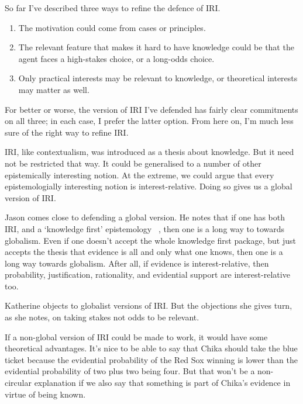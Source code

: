 So far I've described three ways to refine the defence of IRI.

\begin{enumerate}
\item The motivation could come from cases or principles.

\item The relevant feature that makes it hard to have knowledge could be that the agent faces a high-stakes choice, or a long-odds choice.

\item Only practical interests may be relevant to knowledge, or theoretical interests may matter as well.

\end{enumerate}
For better or worse, the version of IRI I've defended has fairly clear commitments on all three; in each case, I prefer the latter option. From here on, I'm much less sure of the right way to refine IRI.

IRI, like contextualism, was introduced as a thesis about knowledge. But it need not be restricted that way. It could be generalised to a number of other epistemically interesting notion. At the extreme, we could argue that every epistemologially interesting notion is interest-relative. Doing so gives us a global version of IRI.

Jason  \citet{Stanley2005} comes close to defending a global version. He notes that if one has both IRI, and a `knowledge first' epistemology ~\citep{Williamson2000}, then one is a long way to towards globalism. Even if one doesn't accept the whole knowledge first package, but just accepts the thesis that evidence is all and only what one knows, then one is a long way towards globalism. After all, if evidence is interest-relative, then probability, justification, rationality, and evidential support are interest-relative too.

Katherine  \citet{Rubin2015} objects to globalist versions of IRI. But the objections she gives turn, as she notes, on taking stakes not odds to be relevant. 

If a non-global version of IRI could be made to work, it would have some theoretical advantages. It's nice to be able to say that Chika should take the blue ticket because the evidential probability of the Red Sox winning is lower than the evidential probability of two plus two being four. But that won't be a non-circular explanation if we also say that something is part of Chika's evidence in virtue of being known.

